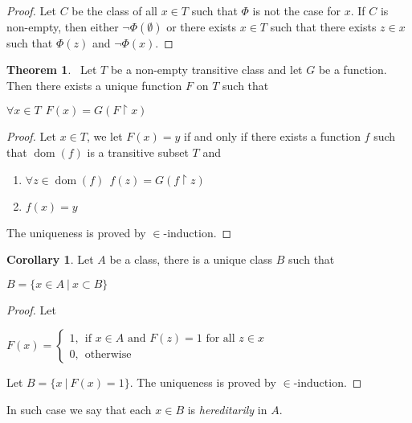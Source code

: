 \documentclass[8pt]{article}
\theoremstyle{definition}
\theoremstyle{definition}
\newtheorem{theorem}{Theorem}[section]
\theoremstyle{definition}
\theoremstyle{definition}
\theoremstyle{definition}
\theoremstyle{definition}
\theoremstyle{definition}
\theoremstyle{definition}
\theoremstyle{definition}
\theoremstyle{definition}
\theoremstyle{definition}
\theoremstyle{definition}
\theoremstyle{definition}
\theoremstyle{definition}
\newtheorem{col}{Corollary}[section]
\theoremstyle{question}
\begin{document}
\begin{proof}
  Let $C$ be the class of all $x \in T$ such that $\Phi$ is not the case for $x$.
  If $C$ is non-empty, then either $\neg \Phi(\emptyset)$ or there
  exists $x \in T$ such that there exists $z \in x$ such that $\Phi(z)$ and $\neg \Phi(x)$.
\end{proof}

\begin{theorem}~\label{in:rec}
  Let $T$ be a non-empty transitive class and let $G$ be a function. Then there exists a unique function $F$ on $T$ such that
  \begin{center}
  $\forall x \in T \:\: F(x) = G(F \upharpoonright x)$
  \end{center}
\end{theorem}

\begin{proof}
  Let $x \in T$, we let $F(x) = y$ if and only if there exists a function $f$ such that 
  $\operatorname{dom}(f)$ is a transitive subset $T$ and 
  \begin{enumerate}
    \item $\forall z \in \operatorname{dom}(f) \:\: f(z) = G(f \upharpoonright z)$
    \item $f(x) = y$
  \end{enumerate}

  The uniqueness is proved by $\in$-induction.
\end{proof}

\begin{col}
  Let $A$ be a class, there is a unique class $B$ such that
  \begin{center}
    $B = \{ x \in A \:| \: x \subset B \}$
  \end{center}
\end{col}

\begin{proof}
  Let
\begin{center}
  $F(x) =
  \begin{cases}
    1, \:\: \text{if $x \in A$ and $F(z) = 1$ for all $z \in x$} \\
    0, \:\: \text{otherwise}
  \end{cases}$
\end{center}

Let $B = \{ x \: |\: F(x) = 1 \}$. The uniqueness is proved by $\in$-induction.
\end{proof}

In such case we say that each $x \in B$ is \emph{hereditarily} in $A$.
\end{document}
